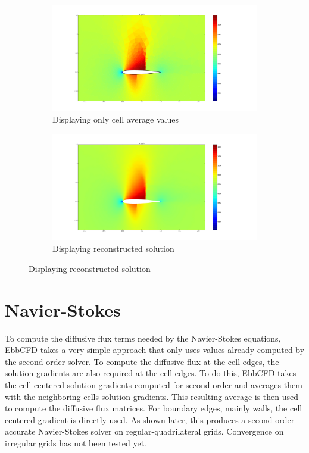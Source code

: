 \documentclass[12pt,parskip=full]{article}
\numberwithin{subsection}{section}
\begin{document}
		\begin{figure}[H]
			\centering
			\begin{subfigure}{0.4\textwidth}
				\hspace*{-2cm}\includegraphics[scale=0.2,trim={7cm 2cm 10cm 2cm},clip]{CellAvgPlot.pdf}
				\hspace*{-2cm}\caption{Displaying only cell average values}
			\end{subfigure}
			\begin{subfigure}{0.4\textwidth}
				\hspace*{1cm}\includegraphics[scale=0.2,trim={7cm 2cm 10cm 2cm},clip]{ReconstructedPlot.pdf}
				\hspace*{1cm}\caption{Displaying reconstructed solution}
			\end{subfigure}
		\end{figure}
		
	\section{Navier-Stokes}
		To compute the diffusive flux terms needed by the Navier-Stokes equations, EbbCFD takes a very simple approach that only uses
		values already computed by the second order solver. To compute the diffusive flux at the cell edges, the solution gradients
		are also required at the cell edges. To do this, EbbCFD takes the cell centered solution gradients computed for second order
		and averages them with the neighboring cells solution gradients. This resulting average is then used to compute the diffusive
		flux matrices. For boundary edges, mainly walls, the cell centered gradient is directly used. As shown later, this produces 
		a second order accurate Navier-Stokes solver on regular-quadrilateral grids. Convergence on irregular grids has not been tested yet.
		
\end{document}
